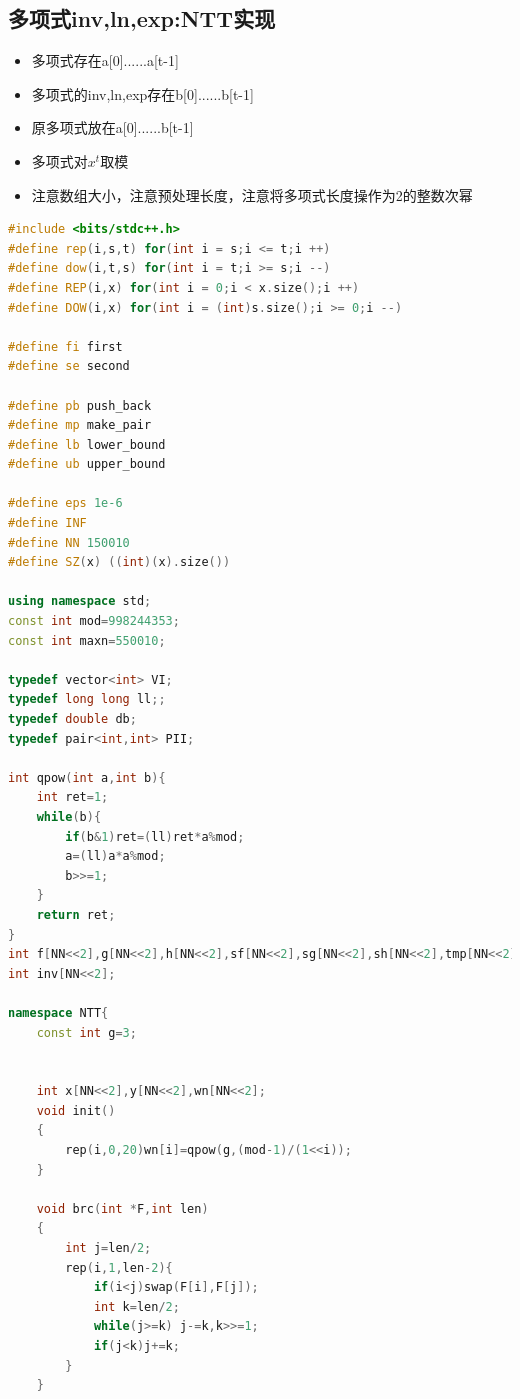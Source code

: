 \documentclass[UTF8,a4paper,titlepage]{ctexart}
\begin{document}
\subsection{多项式inv,ln,exp:NTT实现}
\begin{itemize}
\item 多项式存在a[0]......a[t-1]
\item 多项式的inv,ln,exp存在b[0]......b[t-1]
\item 原多项式放在a[0]......b[t-1]
\item 多项式对$x^t$取模
\item 注意数组大小，注意预处理长度，注意将多项式长度操作为2的整数次幂
\end{itemize}
\begin{lstlisting}[language=C++]
#include <bits/stdc++.h>
#define rep(i,s,t) for(int i = s;i <= t;i ++)
#define dow(i,t,s) for(int i = t;i >= s;i --)
#define REP(i,x) for(int i = 0;i < x.size();i ++)
#define DOW(i,x) for(int i = (int)s.size();i >= 0;i --)

#define fi first
#define se second

#define pb push_back
#define mp make_pair
#define lb lower_bound
#define ub upper_bound

#define eps 1e-6
#define INF
#define NN 150010
#define SZ(x) ((int)(x).size())

using namespace std;
const int mod=998244353;
const int maxn=550010;

typedef vector<int> VI;
typedef long long ll;;
typedef double db;
typedef pair<int,int> PII;

int qpow(int a,int b){
	int ret=1;
	while(b){
		if(b&1)ret=(ll)ret*a%mod;
		a=(ll)a*a%mod;
		b>>=1;
	}
	return ret;
}
int f[NN<<2],g[NN<<2],h[NN<<2],sf[NN<<2],sg[NN<<2],sh[NN<<2],tmp[NN<<2],tmp2[NN<<2];
int inv[NN<<2];

namespace NTT{
    const int g=3;


    int x[NN<<2],y[NN<<2],wn[NN<<2];
    void init()
    {
        rep(i,0,20)wn[i]=qpow(g,(mod-1)/(1<<i));
    }

    void brc(int *F,int len)
    {
        int j=len/2;
        rep(i,1,len-2){
            if(i<j)swap(F[i],F[j]);
            int k=len/2;
            while(j>=k) j-=k,k>>=1;
            if(j<k)j+=k;
        }
    }


\end{lstlisting}
\end{document}
